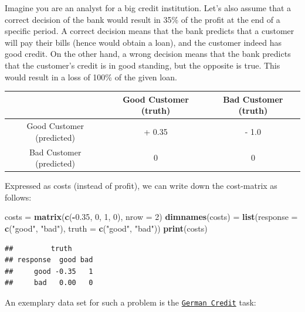 \documentclass[]{scrbook}
\newenvironment{Shaded}{\begin{snugshade}}{\end{snugshade}}
\newcommand{\DataTypeTok}[1]{\textcolor[rgb]{0.13,0.29,0.53}{#1}}
\newcommand{\DecValTok}[1]{\textcolor[rgb]{0.00,0.00,0.81}{#1}}
\newcommand{\FloatTok}[1]{\textcolor[rgb]{0.00,0.00,0.81}{#1}}
\newcommand{\KeywordTok}[1]{\textcolor[rgb]{0.13,0.29,0.53}{\textbf{#1}}}
\newcommand{\NormalTok}[1]{#1}
\newcommand{\OperatorTok}[1]{\textcolor[rgb]{0.81,0.36,0.00}{\textbf{#1}}}
\newcommand{\StringTok}[1]{\textcolor[rgb]{0.31,0.60,0.02}{#1}}
\renewenvironment{Shaded} {\begin{snugshade}\small} {\end{snugshade}}
\begin{document}
Imagine you are an analyst for a big credit institution.
Let's also assume that a correct decision of the bank would result in 35\% of the profit at the end of a specific period.
A correct decision means that the bank predicts that a customer will pay their bills (hence would obtain a loan), and the customer indeed has good credit.
On the other hand, a wrong decision means that the bank predicts that the customer's credit is in good standing, but the opposite is true.
This would result in a loss of 100\% of the given loan.

\begin{longtable}[]{@{}ccc@{}}
\toprule
& Good Customer (truth) & Bad Customer (truth)\tabularnewline
\midrule
\endhead
Good Customer (predicted) & + 0.35 & - 1.0\tabularnewline
Bad Customer (predicted) & 0 & 0\tabularnewline
\bottomrule
\end{longtable}

Expressed as costs (instead of profit), we can write down the cost-matrix as follows:

\begin{Shaded}
\begin{Highlighting}[]
\NormalTok{costs =}\StringTok{ }\KeywordTok{matrix}\NormalTok{(}\KeywordTok{c}\NormalTok{(}\OperatorTok{-}\FloatTok{0.35}\NormalTok{, }\DecValTok{0}\NormalTok{, }\DecValTok{1}\NormalTok{, }\DecValTok{0}\NormalTok{), }\DataTypeTok{nrow =} \DecValTok{2}\NormalTok{)}
\KeywordTok{dimnames}\NormalTok{(costs) =}\StringTok{ }\KeywordTok{list}\NormalTok{(}\DataTypeTok{response =} \KeywordTok{c}\NormalTok{(}\StringTok{"good"}\NormalTok{, }\StringTok{"bad"}\NormalTok{), }\DataTypeTok{truth =} \KeywordTok{c}\NormalTok{(}\StringTok{"good"}\NormalTok{, }\StringTok{"bad"}\NormalTok{))}
\KeywordTok{print}\NormalTok{(costs)}
\end{Highlighting}
\end{Shaded}

\begin{verbatim}
##         truth
## response  good bad
##     good -0.35   1
##     bad   0.00   0
\end{verbatim}

An exemplary data set for such a problem is the \href{https://mlr3.mlr-org.com/reference/mlr_tasks_german_credit.html}{\texttt{German\ Credit}} task:

\begin{Shaded}
\end{Shaded}
\end{document}
